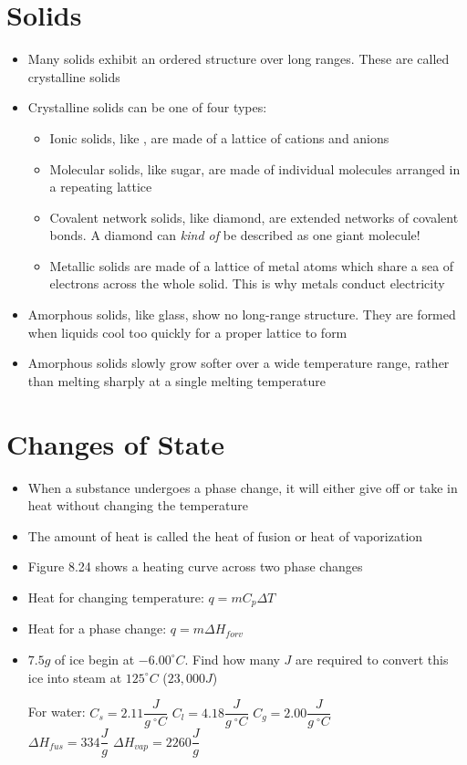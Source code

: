 \documentclass[12pt, openany, letterpaper]{memoir}
\begin{document}
\section{Solids}
\begin{itemize}
	\item Many solids exhibit an ordered structure over long ranges. These are called crystalline solids
	\item Crystalline solids can be one of four types:
	      \begin{itemize}
		      \item Ionic solids, like , are made of a lattice of cations and anions
		      \item Molecular solids, like sugar, are made of individual molecules arranged in a repeating lattice
		      \item Covalent network solids, like diamond, are extended networks of covalent bonds. A diamond can \emph{kind of} be described as one giant molecule!
		      \item Metallic solids are made of a lattice of metal atoms which share a sea of electrons across the whole solid. This is why metals conduct electricity
	      \end{itemize}
	\item Amorphous solids, like glass, show no long-range structure. They are formed when liquids cool too quickly for a proper lattice to form
	\item Amorphous solids slowly grow softer over a wide temperature range, rather than melting sharply at a single melting temperature
\end{itemize}

\section{Changes of State}
\begin{itemize}
	\item When a substance undergoes a phase change, it will either give off or take in heat without changing the temperature
	\item The amount of heat is called the heat of fusion or heat of vaporization
	\item Figure 8.24 shows a heating curve across two phase changes
	\item Heat for changing temperature: $q=mC_p\Delta T$
	\item Heat for a phase change: $q=m\Delta H_{f or v}$
	\item $7.5g$ of ice begin at $-6.00^\circ C$. Find how many $J$ are required to convert this ice into steam at $125^\circ C$ ($23,000J$)

	      For water: $C_{s}=2.11\dfrac{J}{g~^\circ C}$ \hspace{1em} $C_{l}=4.18\dfrac{J}{g~^\circ C}$ \hspace{1em} $C_{g}=2.00\dfrac{J}{g~^\circ C}$ \\ \hphantom{For Water:} $\Delta H_{fus} = 334\dfrac{J}{g}$ \hspace{1em} $\Delta H_{vap} = 2260\dfrac{J}{g}$
\end{itemize}
\end{document}
